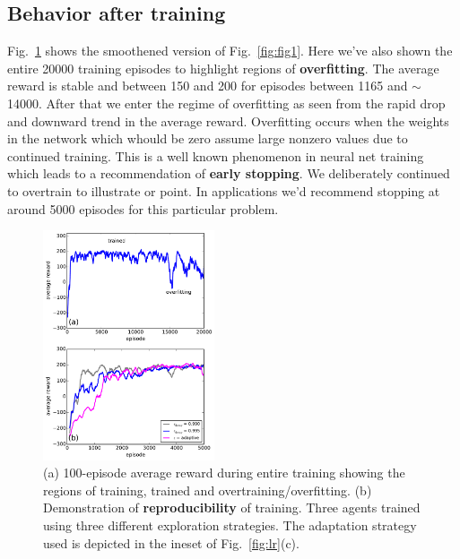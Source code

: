 \documentclass[conference]{IEEEtran}
\begin{document}
\subsection{Behavior after training}
Fig.~\ref{fig:fig2} shows the smoothened version of Fig.~\ref{fig:fig1}. Here we've also shown the entire 20000 training episodes to highlight regions of {\bf overfitting}. The average reward is stable and between 150 and 200 for episodes between  1165 and $\sim$ 14000. After that we enter the regime of overfitting as seen from the rapid drop and downward trend in the average reward. Overfitting occurs when the weights in the network which whould be zero assume large nonzero values due to continued training. This is a well known phenomenon in neural net training which leads to a recommendation of {\bf early stopping}. We deliberately continued to overtrain to illustrate or point. In applications we'd recommend stopping at around 5000 episodes for this particular problem.
\begin{figure}[tbp]
    \centering
    \includegraphics[width=0.45\textwidth]{./figures/fig2.pdf}
    \caption{(a) 100-episode average reward during entire training showing the regions of training, trained and overtraining/overfitting. (b) Demonstration of {\bf reproducibility} of training. Three agents trained using three different exploration strategies. The adaptation strategy used is depicted in the ineset of Fig.~\ref{fig:lr}(c).\label{fig:fig2}}
\end{figure}
\end{document}
